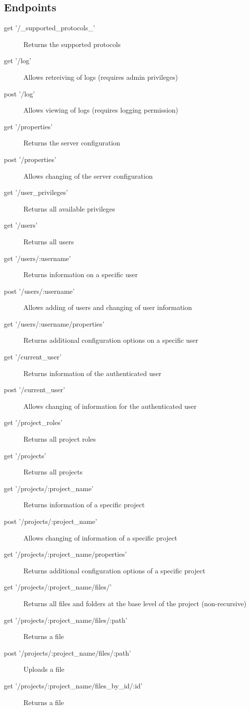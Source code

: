 \subsection{Endpoints}
\begin{description}
\item[get  '/_supported_protocols_'] Returns the supported protocols
\item[get  '/log'] Allows retreiving of logs (requires admin privileges)
\item[post '/log'] Allows viewing of logs (requires logging permission)
\item[get  '/properties'] Returns the server configuration
\item[post '/properties'] Allows changing of the server configuration
\item[get  '/user_privileges'] Returns all available privileges
\item[get  '/users'] Returns all users 
\item[get  '/users/:username'] Returns information on a specific user
\item[post '/users/:username'] Allows adding of users and changing of user information
\item[get  '/users/:username/properties'] Returns additional configuration options on a specific user
\item[get  '/current_user'] Returns information of the authenticated user
\item[post '/current_user'] Allows changing of information for the authenticated user
\item[get  '/project_roles'] Returns all project roles
\item[get  '/projects'] Returns all projects
\item[get  '/projects/:project_name'] Returns information of a specific project
\item[post '/projects/:project_name'] Allows changing of information of a specific project
\item[get  '/projects/:project_name/properties'] Returns additional configuration options of a specific project
\item[get  '/projects/:project_name/files/'] Returns all files and folders at the base level of the project (non-recursive)
\item[get  '/projects/:project_name/files/:path'] Returns a file
\item[post '/projects/:project_name/files/:path'] Uploads a file
\item[get  '/projects/:project_name/files_by_id/:id'] Returns a file
\end{description}